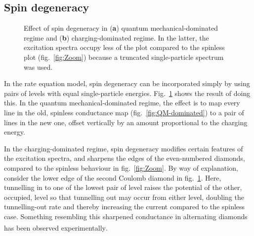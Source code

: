 \documentclass[a4paper,11pt]{article}
\let\oldcite\cite
\renewcommand{\cite}[1]{\textsuperscript{\oldcite{#1}}}
\begin{document}
    \newpage
    \subsection{Spin degeneracy}

    \begin{figure}
    \begin{center}
        \caption{Effect of spin degeneracy in (\textbf{a}) quantum mechanical-dominated regime and (\textbf{b}) charging-dominated regime. In the latter, the excitation spectra occupy less of the plot compared to the spinless plot (fig.~\ref{fig:Zoom}) because a truncated single-particle spectrum was used.}
        \label{fig:Spin_degenaracy}
    \end{center}
    \end{figure}

    In the rate equation model, spin degeneracy can be incorporated simply by using pairs of levels with equal single-particle energies. Fig.~\ref{fig:Spin_degenaracy} shows the result of doing this. In the quantum mechanical-dominated regime, the effect is to map every line in the old, spinless conductance map (fig.~\ref{fig:QM-dominated}) to a pair of lines in the new one, offset vertically by an amount proportional to the charging energy.

    In the charging-dominated regime, spin degeneracy modifies certain features of the excitation spectra, and sharpens the edges of the even-numbered diamonds, compared to the spinless behaviour in fig.~\ref{fig:Zoom}. By way of explanation, consider the lower edge of the second Coulomb diamond in fig.~\ref{fig:Spin_degenaracy}. Here, tunnelling in to one of the lowest pair of level raises the potential of the other, occupied, level so that tunnelling out may occur from either level, doubling the tunnelling-out rate and thereby increasing the current compared to the spinless case. Something resembling this sharpened conductance in alternating diamonds has been observed experimentally\cite{Larsson-2011}.
\end{document}
